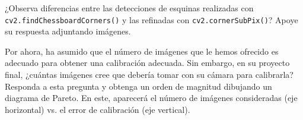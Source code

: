\vspace{5mm}
\begin{tcolorbox}[colback=gray!10, colframe=gray!30, coltitle=black, title=Pregunta A.2, halign=left]
¿Observa diferencias entre las detecciones de esquinas realizadas con \texttt{cv2.findChessboardCorners()} y las refinadas con \texttt{cv2.cornerSubPix()}? Apoye su respuesta adjuntando imágenes.
\end{tcolorbox}

\vspace{5mm}
\begin{tcolorbox}[colback=gray!10, colframe=gray!30, coltitle=black, title=Pregunta A.3, halign=left]
Por ahora, ha asumido que el número de imágenes que le hemos ofrecido es adecuado para obtener una calibración adecuada. Sin embargo, en su proyecto final, ¿cuántas imágenes cree que debería tomar con su cámara para calibrarla? Responda a esta pregunta y obtenga un orden de magnitud dibujando un diagrama de Pareto. En este, aparecerá el número de imágenes consideradas (eje horizontal) vs. el error de calibración (eje vertical).
\end{tcolorbox}